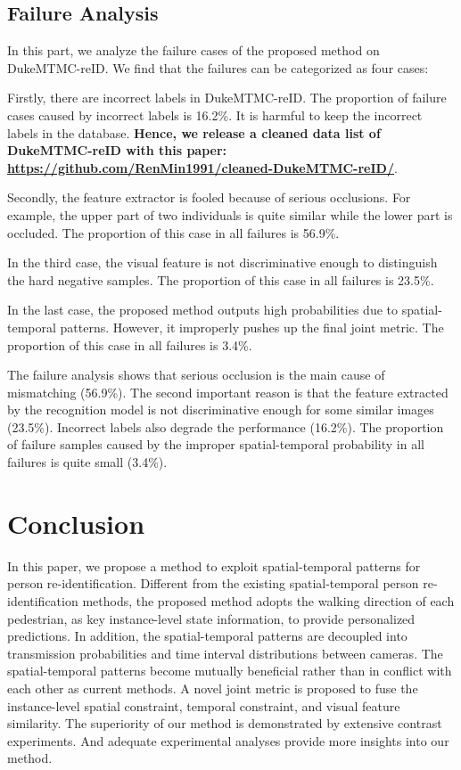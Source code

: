 \documentclass[10pt,twocolumn,letterpaper]{article}
\begin{document}
\subsection{Failure Analysis}
\vspace{-0.15cm}
In this part, we analyze the failure cases of the proposed method on DukeMTMC-reID.
We find that the failures can be categorized as four cases:

Firstly, there are incorrect labels in DukeMTMC-reID. 
The proportion of failure cases caused by incorrect labels is 16.2\%.
It is harmful to keep the incorrect labels in the database. \textbf{Hence, we release a cleaned data list of DukeMTMC-reID with this paper: \url{https://github.com/RenMin1991/cleaned-DukeMTMC-reID/}}.







Secondly, the feature extractor is fooled because of serious occlusions. For example, the upper part of two individuals is quite similar while the lower part is occluded.
The proportion of this case in all failures is 56.9\%.

In the third case, the visual feature is not discriminative enough to distinguish the hard negative samples.
The proportion of this case in all failures is 23.5\%.




In the last case, the proposed method outputs high probabilities due to spatial-temporal patterns. However, it improperly pushes up the final joint metric.
The proportion of this case in all failures is 3.4\%.

The failure analysis shows that serious occlusion is the main cause of mismatching (56.9\%).
The second important reason is that the feature extracted by the recognition model is not discriminative enough for some similar images (23.5\%).
Incorrect labels also degrade the performance (16.2\%).
The proportion of failure samples caused by the improper spatial-temporal probability in all failures is quite small (3.4\%).





\section{Conclusion}
\vspace{-0.1cm}
In this paper, we propose a method to exploit spatial-temporal patterns for person re-identification.
Different from the existing spatial-temporal person re-identification methods, the proposed method adopts the walking direction of each pedestrian, as key instance-level state information, to provide personalized predictions.
In addition, the spatial-temporal patterns are decoupled into transmission probabilities and time interval distributions between cameras. The spatial-temporal patterns become mutually beneficial rather than in conflict with each other as current methods.
A novel joint metric is proposed to fuse the instance-level spatial constraint, temporal constraint, and visual feature similarity.
The superiority of our method is demonstrated by extensive contrast experiments.
And adequate experimental analyses provide more insights into our method.

{\small


}
\end{document}

